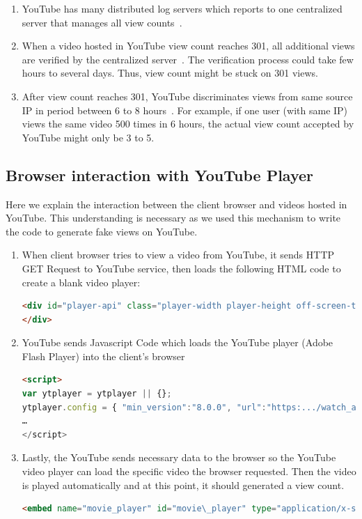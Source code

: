 \documentclass[conference]{IEEEtran}
\begin{document}
\begin{enumerate}
    \item YouTube has many distributed log servers which reports to one centralized server that manages all view counts~\cite{c11}.
    \item When a video hosted in YouTube view count reaches 301, all additional views are verified by the centralized server~\cite{c11}. The verification process could take few hours to several days. Thus, view count might be stuck on 301 views.
    \item After view count reaches 301, YouTube discriminates views from same source IP in period between 6 to 8 hours~\cite{c11}. For example, if one user (with same IP) views the same video 500 times in 6 hours, the actual view count accepted by YouTube might only be 3 to 5.
\end{enumerate}

\subsection{Browser interaction with YouTube Player}

Here we explain the interaction between the client browser and videos hosted in YouTube. This understanding is necessary as we used this mechanism to write the code to generate fake views on YouTube.

\begin{enumerate}
  \item When client browser tries to view a video from YouTube, it sends HTTP GET Request to YouTube service, then loads the following HTML code to create a blank video player:
  \begin{lstlisting}[frame=single, language=html]
<div id="player-api" class="player-width player-height off-screen-target player-api" tabIndex="-1">
</div>
  \end{lstlisting}
  \item YouTube sends Javascript Code which loads the YouTube player (Adobe Flash Player) into the client’s browser
  \begin{lstlisting}[frame=single, language=html]
<script>
var ytplayer = ytplayer || {};
ytplayer.config = { "min_version":"8.0.0", "url":"https:.../watch_as3.swf"
…
</script>
  \end{lstlisting}
  \item Lastly, the YouTube sends necessary data to the browser so the YouTube video player can load the specific video the browser requested. Then the video is played automatically and at this point, it should generated a view count.
  \begin{lstlisting}[frame=single, language=html]
<embed name="movie_player" id="movie\_player" type="application/x-shockwave-flash" src="https:.../watch\_as3.swf" allowscriptaccess="always" bgcolor="#000000" allowfullscreen="true" ...>
  \end{lstlisting}
\end{enumerate}
\end{document}
